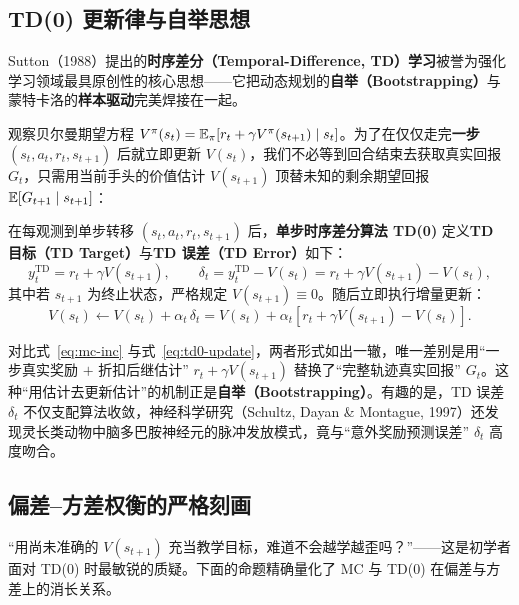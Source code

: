 \subsection{TD(0) 更新律与自举思想}

Sutton（1988）提出的\textbf{时序差分（Temporal-Difference, TD）学习}被誉为强化学习领域最具原创性的核心思想——它把动态规划的\textbf{自举（Bootstrapping）}与蒙特卡洛的\textbf{样本驱动}完美焊接在一起。

观察贝尔曼期望方程 $V^\pi(s_t) = \mathbb{E}_\pi\!\left[r_t + \gamma V^\pi(s_{t+1}) \mid s_t\right]$。为了在仅仅走完\textbf{一步} $(s_t, a_t, r_t, s_{t+1})$ 后就立即更新 $V(s_t)$，我们不必等到回合结束去获取真实回报 $G_t$，只需用当前手头的价值估计 $V(s_{t+1})$ 顶替未知的剩余期望回报 $\mathbb{E}[G_{t+1} \mid s_{t+1}]$：

\begin{defBox}
\begin{definition}[TD(0) 目标、TD 误差与更新规则]
在每观测到单步转移 $(s_t, a_t, r_t, s_{t+1})$ 后，\textbf{单步时序差分算法 TD(0)} 定义\textbf{TD 目标（TD Target）}与\textbf{TD 误差（TD Error）}如下：
\begin{equation}
  y_t^{\mathrm{TD}} = r_t + \gamma V(s_{t+1}), \qquad
  \delta_t = y_t^{\mathrm{TD}} - V(s_t) = r_t + \gamma V(s_{t+1}) - V(s_t),
  \label{eq:td-error}
\end{equation}
其中若 $s_{t+1}$ 为终止状态，严格规定 $V(s_{t+1}) \equiv 0$。随后立即执行增量更新：
\begin{equation}
  V(s_t) \leftarrow V(s_t) + \alpha_t \,\delta_t = V(s_t) + \alpha_t \!\left[r_t + \gamma V(s_{t+1}) - V(s_t)\right].
  \label{eq:td0-update}
\end{equation}
\end{definition}
\end{defBox}

对比式~\eqref{eq:mc-inc} 与式~\eqref{eq:td0-update}，两者形式如出一辙，唯一差别是用“一步真实奖励 $+$ 折扣后继估计” $r_t + \gamma V(s_{t+1})$ 替换了“完整轨迹真实回报” $G_t$。这种“用估计去更新估计”的机制正是\textbf{自举（Bootstrapping）}。有趣的是，TD 误差 $\delta_t$ 不仅支配算法收敛，神经科学研究（Schultz, Dayan \& Montague, 1997）还发现灵长类动物中脑多巴胺神经元的脉冲发放模式，竟与“意外奖励预测误差” $\delta_t$ 高度吻合。

\subsection{偏差--方差权衡的严格刻画}

“用尚未准确的 $V(s_{t+1})$ 充当教学目标，难道不会越学越歪吗？”——这是初学者面对 TD(0) 时最敏锐的质疑。下面的命题精确量化了 MC 与 TD(0) 在偏差与方差上的消长关系。

